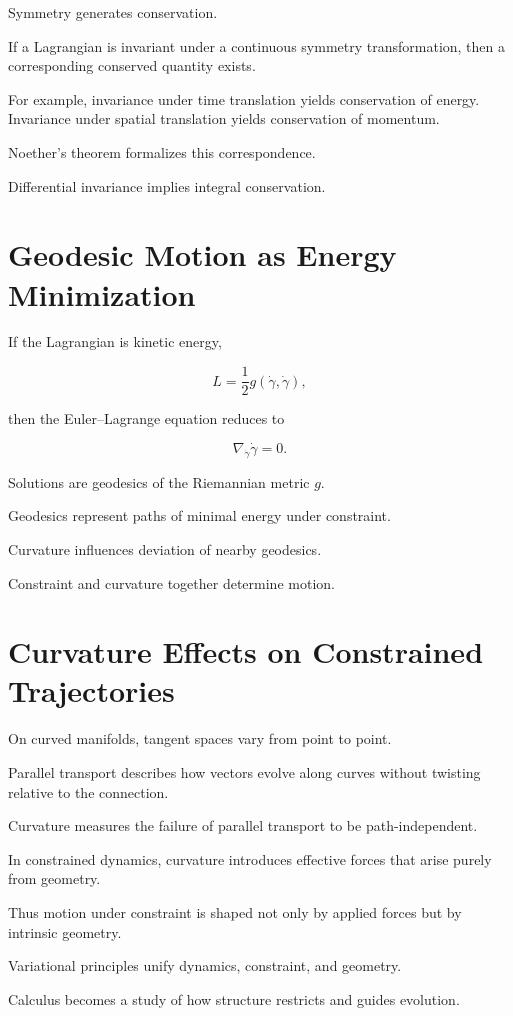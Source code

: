 \documentclass[12pt]{book}
\begin{document}
Symmetry generates conservation.

If a Lagrangian is invariant under a continuous symmetry transformation, then a corresponding conserved quantity exists.

For example, invariance under time translation yields conservation of energy. Invariance under spatial translation yields conservation of momentum.

Noether's theorem formalizes this correspondence.

Differential invariance implies integral conservation.

\section{Geodesic Motion as Energy Minimization}

If the Lagrangian is kinetic energy,

\[
L = \frac{1}{2} g(\dot{\gamma}, \dot{\gamma}),
\]

then the Euler--Lagrange equation reduces to

\[
\nabla_{\dot{\gamma}} \dot{\gamma} = 0.
\]

Solutions are geodesics of the Riemannian metric $g$.

Geodesics represent paths of minimal energy under constraint.

Curvature influences deviation of nearby geodesics.

Constraint and curvature together determine motion.

\section{Curvature Effects on Constrained Trajectories}

On curved manifolds, tangent spaces vary from point to point.

Parallel transport describes how vectors evolve along curves without twisting relative to the connection.

Curvature measures the failure of parallel transport to be path-independent.

In constrained dynamics, curvature introduces effective forces that arise purely from geometry.

Thus motion under constraint is shaped not only by applied forces but by intrinsic geometry.

Variational principles unify dynamics, constraint, and geometry.

Calculus becomes a study of how structure restricts and guides evolution.
\end{document}
